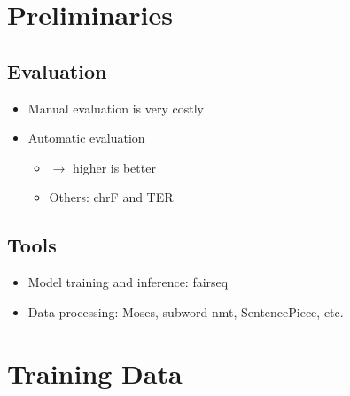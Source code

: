 \documentclass[landscape]{article}
\begin{document}

\cp
\section*{Preliminaries}
\vspace*{10mm}
\subsection*{Evaluation}
\vspace*{5mm}
\begin{itemize} \itemsep=5mm
	\item Manual evaluation is very costly
	\item Automatic evaluation
	\begin{itemize}
		\item {} $\to$ higher is better
		\item Others: chrF and TER
	\end{itemize}
\end{itemize}
\vspace*{-5mm}
\subsection*{Tools}
\vspace*{5mm}
\begin{itemize}
\item Model training and inference: fairseq
\item Data processing: Moses, subword-nmt, SentencePiece, etc.
\end{itemize}


\cp
\section{Training Data}
\vspace*{10mm}
\end{document}
